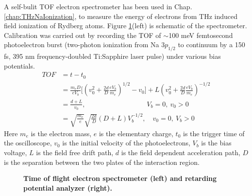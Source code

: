 A self-bulit TOF electron spectrometer has been used in Chap.\@ \ref{chap:THzNaIonization}, to measure the energy of electrons from THz induced field ionization of Rydberg atoms. Figure \ref{fig:TOFandRPA}(left) is schematic of the spectrometer. Calibration was carried out by recording the TOF of $\sim$100 meV femtosecond photoelectron burst (two-photon ionization from Na $3p_{1/2}$ to continuum by a 150 fs, 395 nm frequency-doubled Ti:Sapphire laser pulse) under various bias potentials.
\begin{equation}
    \begin{aligned}
        TOF&= t-t_0 \\
           &= \frac{m_eD}{eV_b}\big[(v_0^2 + \frac{2d}{D}\frac{eV_b}{m_e})^{1/2} - v_0\big] + L(v_0^2 + \frac{2d}{D}\frac{eV_b}{m_e})^{-1/2} \\
           &= \frac{d + L}{v_0}, \quad\quad\quad\quad\quad\quad\quad\quad\quad V_b = 0, \ v_0 > 0 \\
           &= \sqrt{\frac{m_e}{e}} \sqrt{\frac{2d}{D}} (D + L) V_b^{-1/2}, \quad v_0 = 0, \ V_b > 0
    \end{aligned}
\end{equation}
Here $m_e$ is the electron mass, $e$ is the elementary charge, $t_0$ is the trigger time of the oscilloscope, $v_0$ is the initial velocity of the photoelectrons, $V_b$ is the bias voltage, $L$ is the field free drift path, $d$ is the field dependent acceleration path, $D$ is the separation between the two plates of the interaction region.


\begin{figure}[H]
	
	\centering
	\caption[Time of flight electron spectrometer and retarding potential analyzer.]{{\bf Time of flight electron spectrometer (left) and retarding potential analyzer (right).}}
	\label{fig:TOFandRPA}
\end{figure}


